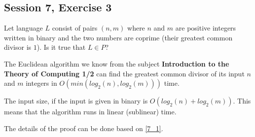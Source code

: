 \subsection {Session 7, Exercise 3}


Let language $L$ consist of pairs $(n,m)$ where $n$ and $m$ are positive integers written in binary and the two numbers are coprime (their greatest common divisor is $1$). Is it true that $L \in{} P$?


The Euclidean algorithm we know from the subject \textbf{Introduction to the Theory of Computing 1/2} can find the greatest common divisor of its input $n$ and $m$ integers in $O(min(log_2(n), log_2(m)))$ time.

The input size, if the input is given in binary is $O(log_2(n) + log_2(m))$. This means that the algorithm runs in linear (sublinear) time.

The details of the proof can be done based on \ref{7_1}.